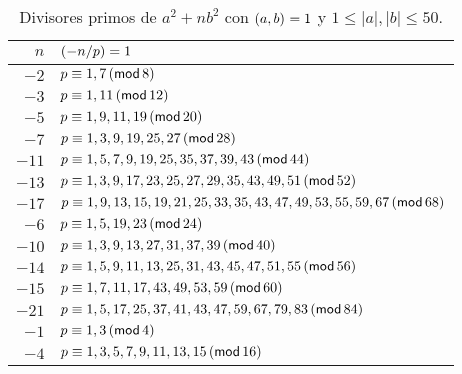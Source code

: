 \begin{table}
	\begin{tabular}{r|l}
		$n$ & $\tlegendre{-n} p=1$ \\
		\hline
		$-2$ & $p\equiv 1,7\tmodulo[8]$ \\
		$-3$ & $p\equiv 1,11\tmodulo[12]$ \\
		$-5$ & $p\equiv 1,9,11,19\tmodulo[20]$ \\
		$-7$ & $p\equiv 1,3,9,19,25,27\tmodulo[28]$ \\
		$-11$ & $p\equiv 1,5,7,9,19,25,35,37,39,43\tmodulo[44]$ \\
		$-13$ & $p\equiv 1,3,9,17,23,25,27,29,35,43,49,51
			\tmodulo[52]$ \\
		$-17$ & $p\equiv 1,9,13,15,19,21,25,33,35,43,47,49,53,55,59,67
			\tmodulo[68]$ \\
		\hline
		$-6$ & $p\equiv 1,5,19,23\tmodulo[24]$ \\
		$-10$ & $p\equiv 1,3,9,13,27,31,37,39\tmodulo[40]$ \\
		$-14$ & $p\equiv 1,5,9,11,13,25,31,43,45,47,51,55
			\tmodulo[56]$ \\
		$-15$ & $p\equiv 1,7,11,17,43,49,53,59\tmodulo[60]$ \\
		$-21$ & $p\equiv 1,5,17,25,37,41,43,47,59,67,79,83
			\tmodulo[84]$ \\
		\hline
		$-1$ & $p\equiv 1,3\tmodulo[4]$ \\
		$-4$ & $p\equiv 1,3,5,7,9,11,13,15\tmodulo[16]$ 
	\end{tabular}
	\caption{
		Divisores primos de $a^2+nb^2$ con $\mcd{a,b}=1$ y
		$1\leq |a|,|b|\leq 50$.
	}\label{tab:ecuacion:legendre:negativos}
\end{table}

